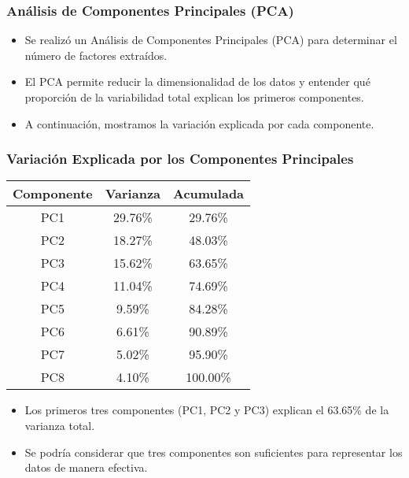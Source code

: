 \documentclass[
	11pt, %
]{beamer}
\begin{document}
\begin{frame}
\frametitle{Análisis de Componentes Principales (PCA)}

\begin{itemize}
    \item Se realizó un Análisis de Componentes Principales (PCA) para determinar el número de factores extraídos.
    \item El PCA permite reducir la dimensionalidad de los datos y entender qué proporción de la variabilidad total explican los primeros componentes.
    \item A continuación, mostramos la variación explicada por cada componente.
\end{itemize}

\end{frame}

\begin{frame}
\frametitle{Variación Explicada por los Componentes Principales}

\begin{table}[ht]
\centering
\scriptsize
\begin{tabular}{|c|c|c|}
\hline
\textbf{Componente} & \textbf{Varianza} & \textbf{Acumulada} \\ \hline
PC1 & 29.76\% & 29.76\% \\ \hline
PC2 & 18.27\% & 48.03\% \\ \hline
PC3 & 15.62\% & 63.65\% \\ \hline
PC4 & 11.04\% & 74.69\% \\ \hline
PC5 & 9.59\% & 84.28\% \\ \hline
PC6 & 6.61\% & 90.89\% \\ \hline
PC7 & 5.02\% & 95.90\% \\ \hline
PC8 & 4.10\% & 100.00\% \\ \hline
\end{tabular}
\end{table}

\begin{itemize}
    \item Los primeros tres componentes (PC1, PC2 y PC3) explican el 63.65\% de la varianza total.
    \item Se podría considerar que tres componentes son suficientes para representar los datos de manera efectiva.
\end{itemize}

\end{frame}
\end{document}
